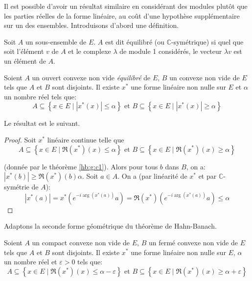 Il est possible d'avoir un résultat similaire en considérant
des modules plutôt que les parties réelles de la forme linéaire,
au coût d'une hypothèse supplémentaire sur un des ensembles.
Introduisons d'abord une définition.

\begin{df}
  Soit $A$ un sous-ensemble de $E$. $A$ est dit équilibré
  (ou $\mathbb{C}$-symétrique) si quel que soit
  l'élément $v$ de $A$ et le complexe $\lambda$ de module 1 considérés, le vecteur
  $\lambda{}v$ est un élément de $A$.
\end{df}

\begin{cor}\label{hb:g:cc1}
  Soient $A$ un ouvert convexe non vide \emph{équilibré} de $E$, $B$ un
  convexe non vide de $E$ tels que $A$ et $B$ sont disjoints. Il existe
  $x^*$ une forme linéaire non nulle sur $E$ et $\alpha$ un nombre réel tels que:
  $$A\subseteq \left\{x\in E\mid |x^*(x)| \leq \alpha\right\} \mbox{ et }
  B\subseteq \left\{x\in E\mid |x^*(x)| \geq \alpha\right\} $$
\end{cor}

Le résultat est le suivant.

\begin{proof}

  Soit $x^*$ linéaire continue telle que
  $$A\subseteq \left\{x\in E\mid \Re(x^*)(x) \leq \alpha\right\} \mbox{ et }
  B\subseteq \left\{x\in E\mid \Re(x^*)(x) \geq \alpha\right\} $$

  (donnée par le théorème \ref{hb:g:c1}). Alors pour tous $b$ dans $B$,
  on a: $|x^*(b)|\geq \Re(x^*)(b) \alpha$.
  Soit $a\in A$. On a (par linéarité de $x^*$ et par $\mathbb{C}$-symétrie
  de $A$):
  $$|x^*(a)| = x^*(e^{-i\arg(x^*(a))}a) =
  \Re(x^*)(e^{-i\arg(x^*(a))}a)\leq \alpha$$
\end{proof}

Adaptons la seconde forme géométrique du théorème de Hahn-Banach.
\begin{thm}
  Soient $A$ un compact convexe non vide de $E$, $B$ un fermé
  convexe non vide de $E$ tels que $A$ et $B$ sont disjoints. Il existe
  $x^*$ une forme linéaire non nulle sur $E$, $\alpha$ un nombre réel et
  $\varepsilon > 0$ tels que:
  $$A\subseteq \left\{x\in E\mid \Re(x^*)(x) \leq \alpha-\varepsilon\right\} \mbox{ et }
  B\subseteq \left\{x\in E\mid \Re(x^*)(x) \geq \alpha+\varepsilon\right\} $$
\end{thm}

